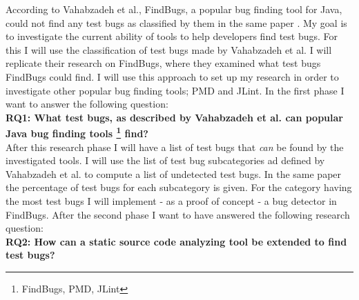 \documentclass{uvamscse}
\newcommand{\Atestbugs}{Vahabzadeh et al.}
\begin{document}
According to \Atestbugs{}, FindBugs, a popular bug finding tool for Java, could not find any test bugs as classified by them in the same paper \cite{vahabzadeh2015empirical}. My goal is to investigate the current ability of tools to help developers find test bugs. For this I will use the classification of test bugs made by \Atestbugs{} I will replicate their research on FindBugs, where they examined what test bugs FindBugs could find. I will use this approach to set up my research in order to investigate other popular bug finding tools; PMD and JLint. In the first phase I want to answer the following question: \\

\textbf{RQ1: What test bugs, as described by \Atestbugs{} can popular Java bug finding tools \footnote{FindBugs, PMD, JLint} find?} \label{RQ_1} \\




After this research phase I will have a list of test bugs that \textit{can} be found by the investigated tools. I will use the list of test bug subcategories ad defined by \Atestbugs{} to compute a list of undetected test bugs. In the same paper the percentage of test bugs for each subcategory is given. For the category having the most test bugs I will implement - as a proof of concept - a bug detector in FindBugs. After the second phase I want to have answered the following research question:\\

\textbf{RQ2: How can a static source code analyzing tool be extended to find test bugs?} \\
\end{document}
